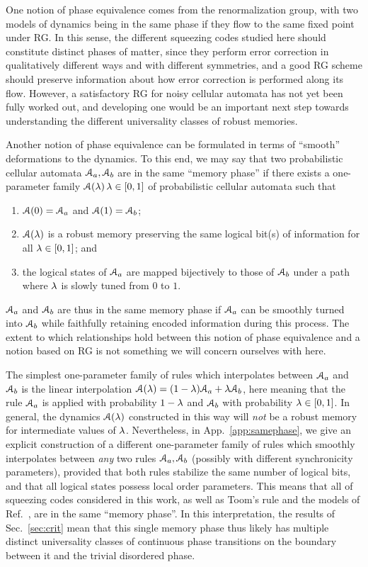 \documentclass[pra,aps,twocolumn,groupedaddress,superscriptaddress,nofootinbib,preprintnumbers]{revtex4-2}
\begin{document}
	One notion of phase equivalence comes from the renormalization group, with two models of dynamics being in the same phase if they flow to the same fixed point under RG. In this sense, the different squeezing codes studied here should constitute distinct phases of matter, since they perform error correction in qualitatively different ways and with different symmetries, and a good RG scheme should preserve information about how error correction is performed along its flow. However, a satisfactory RG for noisy cellular automata has not yet been fully worked out, and developing one would be an important next step towards understanding the different universality classes of robust memories.
	
	Another notion of phase equivalence can be formulated in terms of ``smooth'' deformations to the dynamics. To this end, we may say that two probabilistic cellular automata $\mathcal{A}_a,\mathcal{A}_b$ are in the same ``memory phase'' if there exists a one-parameter family $\mathcal{A}(\lambda)\, \lambda \in [0,1]$ of probabilistic cellular automata such that 
	\begin{enumerate} 
		\item $\mathcal{A}(0) = \mathcal{A}_a$ and $\mathcal{A}(1) = \mathcal{A}_b$;
		\item $\mathcal{A}(\lambda)$ is a robust memory preserving the same logical bit(s) of information for all $\lambda \in [0,1]$; and 
		\item the logical states of $\mathcal{A}_a$ are mapped bijectively to those of $\mathcal{A}_b$ under a path where $\lambda$ is slowly tuned from $0$ to $1$.
	\end{enumerate}
	$\mathcal{A}_a$ and $\mathcal{A}_b$ are thus in the same memory phase if $\mathcal{A}_a$ can be smoothly turned into $\mathcal{A}_b$ while faithfully retaining encoded information during this process. The extent to which relationships hold between this notion of phase equivalence and a notion based on RG is not something we will concern ourselves with here. 
	
	The simplest one-parameter family of rules which interpolates between $\mathcal{A}_a$ and $\mathcal{A}_b$ is the linear interpolation $\mathcal{A}(\lambda) = (1-\lambda)\mathcal{A}_a+ \lambda \mathcal{A}_b$, here meaning that the rule $\mathcal{A}_a$ is applied with probability $1-\lambda$ and $\mathcal{A}_b$ with probability $\lambda \in [0,1]$. 
    In general, the dynamics $\mathcal{A}(\lambda)$ constructed in this way will {\it not} be a robust memory for intermediate values of $\lambda$. 	
	Nevertheless, in App.~\ref{app:samephase}, we give an explicit construction of a different one-parameter family of rules which smoothly interpolates between {\it any} two rules $\mathcal{A}_a,\mathcal{A}_b$ (possibly with different synchronicity parameters), provided that both rules stabilize the same number of logical bits, and that all logical states possess local order parameters. 
	This means that all of squeezing codes considered in this work, as well as Toom's rule and the models of Ref.~\cite{pajouheshgar2025exploring}, are in the same ``memory phase''. In this interpretation, the results of Sec.~\ref{sec:crit} mean that this single memory phase thus likely has multiple distinct universality classes of continuous phase transitions on the boundary between it and the trivial disordered phase.  
	
\end{document}
